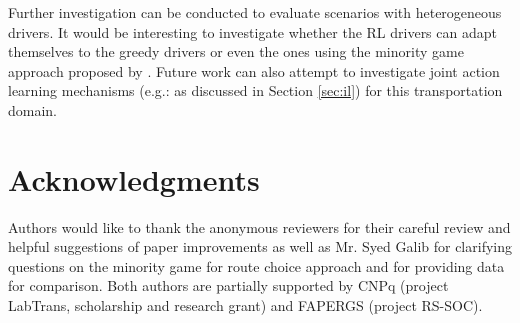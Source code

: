 \documentclass{RITA}
\begin{document}
Further investigation can be conducted to evaluate scenarios with heterogeneous drivers. It would be interesting to investigate whether the RL drivers can adapt themselves to the greedy drivers or even the ones using the minority game approach proposed by \cite{Galib&Moser2011}. Future work can also attempt to investigate joint action learning mechanisms (e.g.: as discussed in Section \ref{sec:il}) for this transportation domain. %

\section*{Acknowledgments}

Authors would like to thank the anonymous reviewers for their careful review and helpful suggestions of paper improvements as well as Mr. Syed Galib for clarifying questions on the minority game for route choice approach and for providing data for comparison. Both authors are partially supported by CNPq (project LabTrans, scholarship and research grant) and FAPERGS (project RS-SOC). %


 
\end{document}
